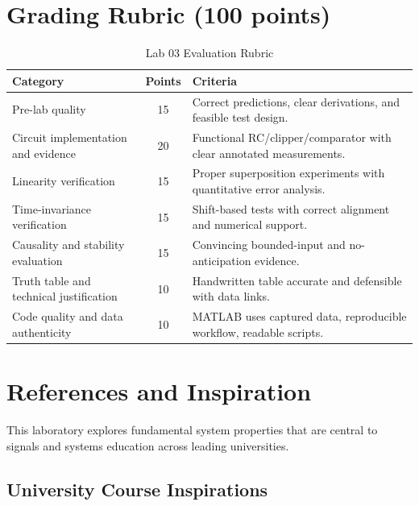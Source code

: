 \documentclass[11pt,letterpaper]{article}
\begin{document}
\section{Grading Rubric (100 points)}
\begin{table}[H]
\centering
\caption{Lab 03 Evaluation Rubric}
\begin{tabularx}{\linewidth}{l c X}
\toprule
\textbf{Category} & \textbf{Points} & \textbf{Criteria} \\
\midrule
Pre-lab quality & 15 & Correct predictions, clear derivations, and feasible test design. \\
Circuit implementation and evidence & 20 & Functional RC/clipper/comparator with clear annotated measurements. \\
Linearity verification & 15 & Proper superposition experiments with quantitative error analysis. \\
Time-invariance verification & 15 & Shift-based tests with correct alignment and numerical support. \\
Causality and stability evaluation & 15 & Convincing bounded-input and no-anticipation evidence. \\
Truth table and technical justification & 10 & Handwritten table accurate and defensible with data links. \\
Code quality and data authenticity & 10 & MATLAB uses captured data, reproducible workflow, readable scripts. \\
\bottomrule
\end{tabularx}
\end{table}

\clearpage

\section*{References and Inspiration}

This laboratory explores fundamental system properties that are central to signals and systems education across leading universities.

\subsection*{University Course Inspirations}
\end{document}
